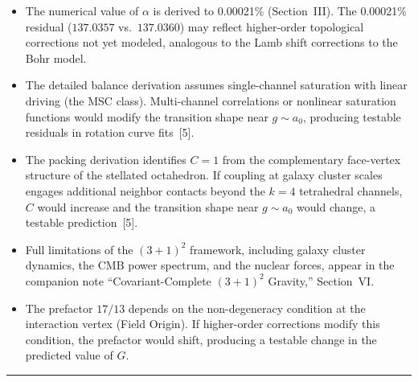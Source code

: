 \documentclass[11pt]{article}
\begin{document}
\begin{itemize}[leftmargin=2em]
\item The numerical value of $\alpha$ is derived to 0.00021\% (Section~III).
The 0.00021\% residual ($137.0357$ vs.\ $137.0360$) may reflect higher-order topological corrections not yet modeled, analogous to the Lamb shift corrections to the Bohr model.

\item The detailed balance derivation assumes single-channel saturation with linear driving (the MSC class).
Multi-channel correlations or nonlinear saturation functions would modify the transition shape near $g \sim a_0$, producing testable residuals in rotation curve fits~[5].

\item The packing derivation identifies $C = 1$ from the complementary face-vertex structure of the stellated octahedron.
If coupling at galaxy cluster scales engages additional neighbor contacts beyond the $k = 4$ tetrahedral channels, $C$ would increase and the transition shape near $g \sim a_0$ would change, a testable prediction~[5].

\item Full limitations of the $(3+1)^2$ framework, including galaxy cluster dynamics, the CMB power spectrum, and the nuclear forces, appear in the companion note ``Covariant-Complete $(3+1)^2$ Gravity,'' Section~VI.

\item The prefactor $17/13$ depends on the non-degeneracy condition at the interaction vertex (Field Origin).
If higher-order corrections modify this condition, the prefactor would shift, producing a testable change in the predicted value of $G$.
\end{itemize}

\vspace{0.8cm}
\hrule
\vspace{0.5cm}
\end{document}
